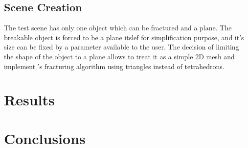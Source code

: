 \documentclass[tog]{acmsiggraph}
\begin{document}
\subsection{Scene Creation}

The test scene has only one object which can be fractured and a plane. The breakable object is forced to be a plane itslef for simplification purpose, and it's size can be fixed by a parameter available to the user. The decision of limiting the shape of the object to a plane allows to treat it as a simple 2D mesh and implement \cite{Obrien:1999:GMA}'s fracturing algorithm using triangles instead of tetrahedrons. 

\section{Results}

\section{Conclusions}







  
\end{document}
